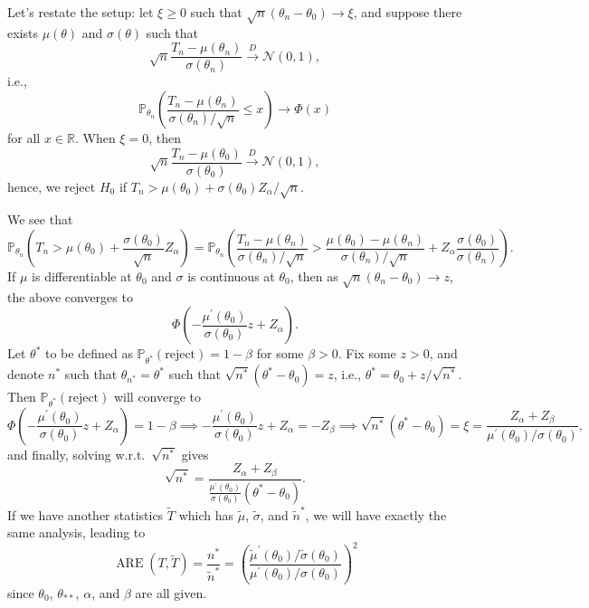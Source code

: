 Let's restate the setup: let \(\xi \geq 0\) such that \(\sqrt{n} (\theta _n - \theta _0) \to \xi \), and suppose there exists \(\mu (\theta )\) and \(\sigma (\theta )\) such that
\[
	\sqrt{n} \frac{T_n - \mu (\theta _n)}{\sigma (\theta _n)}
	\overset{D}{\to} \mathcal{N} (0, 1),
\]
i.e.,
\[
	\mathbb{P} _{\theta _n} \left( \frac{T_n - \mu (\theta _n)}{\sigma (\theta _n) / \sqrt{n} } \leq x \right)
	\to \Phi (x)
\]
for all \(x \in \mathbb{R} \). When \(\xi = 0\), then
\[
	\sqrt{n} \frac{T_n - \mu (\theta _0)}{\sigma (\theta _0)}
	\overset{D}{\to} \mathcal{N} (0, 1),
\]
hence, we reject \(H_0\) if \(T_n > \mu (\theta _0) + \sigma (\theta _0) Z_\alpha / \sqrt{n} \).

We see that
\[
	\mathbb{P} _{\theta _n} \left( T_n > \mu (\theta _0) + \frac{\sigma (\theta _0)}{\sqrt{n} } Z_\alpha \right)
	= \mathbb{P} _{\theta _n} \left( \frac{T_n - \mu (\theta _n)}{\sigma (\theta _n) / \sqrt{n} } > \frac{\mu (\theta _0) - \mu (\theta _n)}{\sigma (\theta _n) / \sqrt{n} } + Z_\alpha \frac{\sigma (\theta _0)}{\sigma (\theta _n)} \right).
\]
If \(\mu \) is differentiable at \(\theta _0\) and \(\sigma \) is continuous at \(\theta _0\), then as \(\sqrt{n} (\theta _n - \theta _0) \to z\), the above converges to
\[
	\Phi \left( - \frac{\mu ^{\prime} (\theta _0)}{\sigma (\theta _0)}z + Z_\alpha \right).
\]
Let \(\theta ^{\ast} \) to be defined as \(\mathbb{P} _{\theta ^{\ast} }(\text{reject} ) = 1 - \beta \) for some \(\beta > 0\). Fix some \(z > 0\), and denote \(n^{\ast} \) such that \(\theta _{n^{\ast} } = \theta ^{\ast} \) such that \(\sqrt{n^{\ast} } (\theta ^{\ast} - \theta _0) = z\), i.e., \(\theta ^{\ast} = \theta _0 + z / \sqrt{n^{\ast} } \). Then \(\mathbb{P} _{\theta ^{\ast} }(\text{reject} )\) will converge to
\[
	\Phi \left( - \frac{\mu ^{\prime} (\theta _0)}{\sigma (\theta _0)}z + Z_\alpha \right)
	= 1 - \beta
	\implies - \frac{\mu ^{\prime} (\theta _0)}{\sigma (\theta _0)}z + Z_\alpha
	= - Z_\beta
	\implies \sqrt{n^{\ast} }(\theta ^{\ast} - \theta _0) = \xi = \frac{Z_\alpha + Z_\beta }{\mu ^{\prime} (\theta _0) / \sigma (\theta _0)},
\]
and finally, solving w.r.t.\ \(\sqrt{n^{\ast} } \) gives
\[
	\sqrt{n^{\ast} }
	= \frac{Z_\alpha + Z_\beta }{\frac{\mu ^{\prime} (\theta _0)}{\sigma (\theta _0)} (\theta ^{\ast} - \theta _0)}.
\]
If we have another statistics \(\widetilde{T} \) which has \(\widetilde{\mu} \), \(\widetilde{\sigma} \), and \(\widetilde{n} ^{\ast} \), we will have exactly the same analysis, leading to
\[
	\operatorname{ARE}(T, \widetilde{T} )
	= \frac{n^{\ast} }{\widetilde{n} ^{\ast} }
	= \left( \frac{\widetilde{\mu} ^{\prime} (\theta _0) / \widetilde{\sigma} (\theta _0)}{\mu ^{\prime} (\theta _0) / \sigma (\theta _0)} \right) ^2
\]
since \(\theta _0\), \(\theta _{\ast\ast} \), \(\alpha \), and \(\beta \) are all given.

